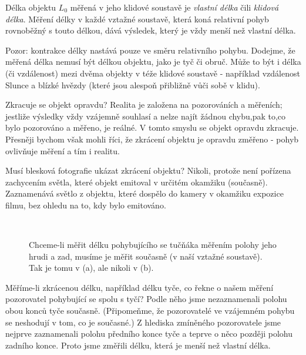     \begin{tcnote}
      Délka objektu \(L_0\) měřená v jeho klidové soustavě je \emph{vlastní délka} čili
      \emph{klidová délka}. Měření délky v každé vztažné soustavě, která koná relativní pohyb
      rovnoběžný s touto délkou, dává výsledek, který je vždy menší než vlastní délka.
    \end{tcnote}

    Pozor: kontrakce délky nastává pouze ve směru relativního pohybu. Dodejme, že měřená délka
    nemusí být délkou objektu, jako je tyč či obruč. Může to být i délka (či vzdálenost) mezi dvěma
    objekty v téže klidové soustavě - například vzdálenost Slunce a blízké hvězdy (které jsou
    alespoň přibližně vůči sobě v klidu).

    Zkracuje se objekt opravdu? Realita je založena na pozorováních a měřeních; jestliže výsledky
    vždy vzájemně souhlasí a nelze najít žádnou chybu,pak to,co bylo pozorováno a měřeno, je reálné.
    V tomto smyslu se objekt opravdu zkracuje. Přesněji bychom však mohli říci, že zkrácení objektu
    je opravdu změřeno - pohyb ovlivňuje měření a tím i realitu.
    
    Musí blesková fotografie ukázat zkrácení objektu? Nikoli, protože není pořízena zachycením
    světla, které objekt emitoval v určitém okamžiku (současně). Zaznamenává světlo z objektu, které
    dospělo do kamery v okamžiku expozice filmu, bez ohledu na to, kdy bylo emitováno.

    \begin{figure}[ht!]  %
      \centering
                    \\                                                   
      \caption{Chceme-li měřit délku pohybujícího se tučňáka měřením polohy jeho hrudi a zad, 
               musíme je měřit současně (v naší vztažné soustavě). Tak je tomu v (a), ale nikoli v 
               (b). \cite[s.~1015]{Halliday2001}}
      \label{fyz:fig0957}
    \end{figure}

    Měříme-li zkrácenou délku, například délku tyče, co řekne o našem měření pozorovatel pohybující
    se spolu s tyčí? Podle něho jsme nezaznamenali polohu obou konců tyče současně. (Připomeňme, že
    pozorovatelé ve vzájemném pohybu se neshodují v tom, co je současné.) Z hlediska zmíněného
    pozorovatele jsme nejprve zaznamenali polohu předního konce tyče a teprve o něco později polohu
    zadního konce. Proto jsme změřili délku, která je menší než vlastní délka.

